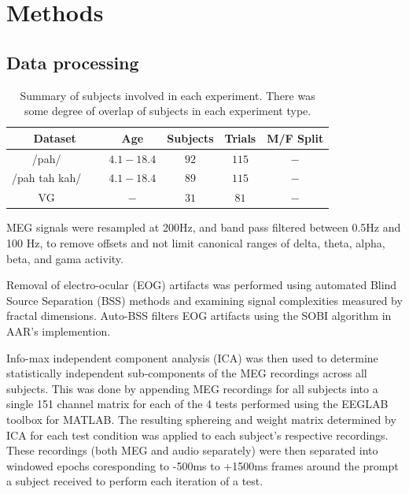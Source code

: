 \documentclass[a4paper]{article}
\begin{document}
\section{Methods}


\subsection{Data processing}

\begin{table}[t]
  \caption{Summary of subjects involved in each experiment. There was some degree of overlap of subjects in each experiment type.}
  \label{tab:subjects}
  \centering
  \begin{tabular}{ c@{}c c c c }
    \toprule
    \multicolumn{1}{c}{\textbf{Dataset}} & \multicolumn{1}{c}{\textbf{Age}} & \multicolumn{1}{c}{\textbf{Subjects}} & \multicolumn{1}{c}{\textbf{Trials}}  & \multicolumn{1}{c}{\textbf{M/F Split}} \\
    \midrule
    /pah/~~~                    & $4.1-18.4$   &   $92$   &   $115$   &   $-$ \\
    /pah tah kah/~~~                & $4.1-18.4$   &   $89$   &   $115$   &   $-$ \\
    VG~~~                      & $-$   &   $31$   &   $81$    &   $-$  \\
    \bottomrule
  \end{tabular}
\end{table}

MEG signals were resampled at 200Hz, and band pass filtered between 0.5Hz and 100 Hz, to remove offsets and not limit canonical ranges of delta, theta, alpha, beta, and gama activity. 

Removal of electro-ocular (EOG) artifacts was performed using automated Blind Source Separation (BSS) methods and examining signal complexities measured by fractal dimensions. Auto-BSS filters EOG artifacts using the SOBI algorithm in AAR's implemention.

Info-max independent component analysis (ICA) \cite{Bell1995} was then used to determine statistically independent sub-components of the MEG recordings across all subjects. This was done by appending MEG recordings for all subjects into a single 151 channel matrix for each of the 4 tests performed using the EEGLAB toolbox \cite{Delorme04eeglab} for MATLAB. The resulting sphereing and weight matrix determined by ICA for each test condition was applied to each subject's respective recordings. These recordings (both MEG and audio separately) were then separated into windowed epochs coresponding to -500ms to +1500ms frames around the prompt a subject received to perform each iteration of a test.
\end{document}
